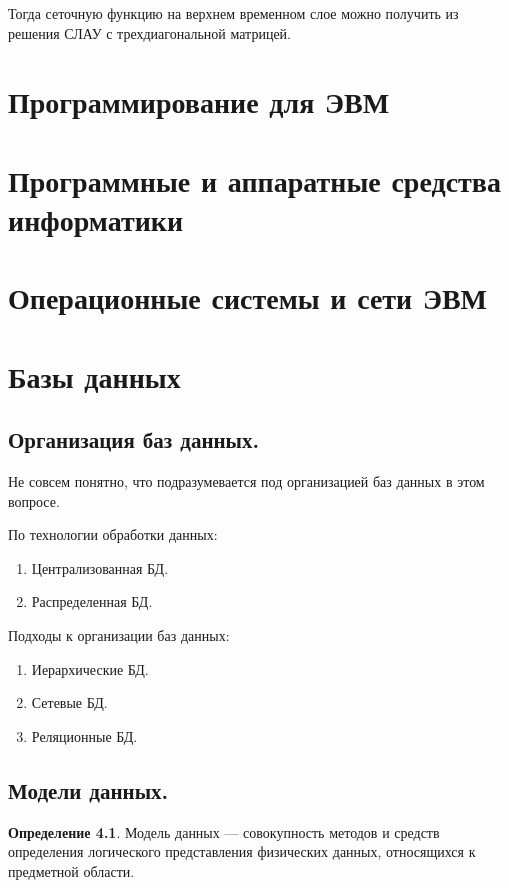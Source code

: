 \documentclass[12pt]{report}
\theoremstyle{definition}
\newtheorem{definition}[theorem]{Определение}
\begin{document}
Тогда сеточную функцию на верхнем временном слое можно получить из решения СЛАУ
с трехдиагональной матрицей.


\chapter{Программирование для ЭВМ}

\chapter{Программные и аппаратные средства информатики}

\chapter{Операционные системы и сети ЭВМ}

\chapter{Базы данных}

\section{Организация баз данных.}

Не совсем понятно, что подразумевается под организацией баз данных
в этом вопросе.

По технологии обработки данных:
\begin{enumerate}
\item Централизованная БД.
\item Распределенная БД.
\end{enumerate}

Подходы к организации баз данных:
\begin{enumerate}
\item Иерархические БД.
\item Сетевые БД.
\item Реляционные БД.
\end{enumerate}


\section{Модели данных.}

\begin{definition}
Модель данных --- совокупность методов и средств
определения логического представления физических данных,
относящихся к предметной области.
\end{definition}
\end{document}
